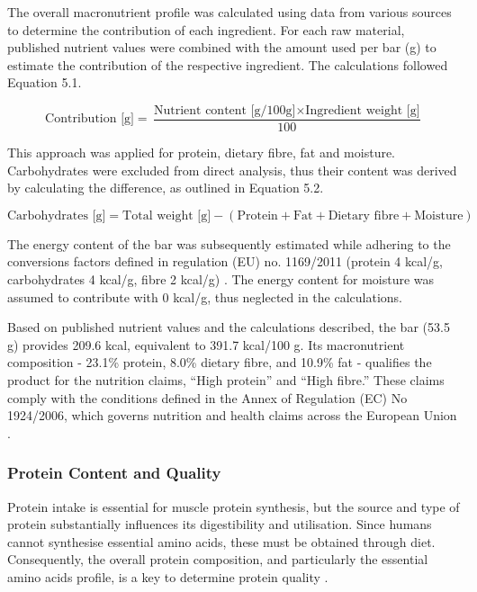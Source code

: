 \vspace{1em}
The overall macronutrient profile was calculated using data from various sources to determine the contribution of each ingredient. For each raw material, published nutrient values were combined with the amount used per bar (g) to estimate the contribution of the respective ingredient. The calculations followed Equation 5.1. 


\begin{equation}
    \text{Contribution [g]} = 
    \frac{\text{Nutrient content [g/100g]} \times \text{Ingredient weight [g]}}{100}
    \label{eq:contribution}
\end{equation}

This approach was applied for protein, dietary fibre, fat and moisture. Carbohydrates were excluded from direct analysis, thus their content was derived by calculating the difference, as outlined in Equation 5.2. 

\begin{equation}
    \text{Carbohydrates [g]} = 
    \text{Total weight [g]} - (\text{Protein} + \text{Fat} + \text{Dietary fibre} + \text{Moisture})
    \label{eq:carbohydrates}
\end{equation}

The energy content of the bar was subsequently estimated while adhering to the conversions factors defined in regulation (EU) no. 1169/2011 (protein 4 kcal/g, carbohydrates 4 kcal/g, fibre 2 kcal/g) \cite*{art_17}. The energy content for moisture was assumed to contribute with 0 kcal/g, thus neglected in the calculations. 

\vspace{1em}
Based on published nutrient values and the calculations described, the bar (53.5 g) provides 209.6 kcal, equivalent to 391.7 kcal/100 g. Its macronutrient composition - 23.1\% protein, 8.0\% dietary fibre, and 10.9\% fat - qualifies the product for the nutrition claims, “High protein” and “High fibre.” These claims comply with the conditions defined in the Annex of Regulation (EC) No 1924/2006, which governs nutrition and health claims across the European Union \cite*{art_16}.    

\subsubsection{Protein Content and Quality}
Protein intake is essential for muscle protein synthesis, but the source and type of protein substantially influences its digestibility and utilisation. Since humans cannot synthesise essential amino acids, these must be obtained through diet. Consequently, the overall protein composition, and particularly the essential amino acids profile, is a key to determine protein quality \cite*{art_08_protein_amino}.

